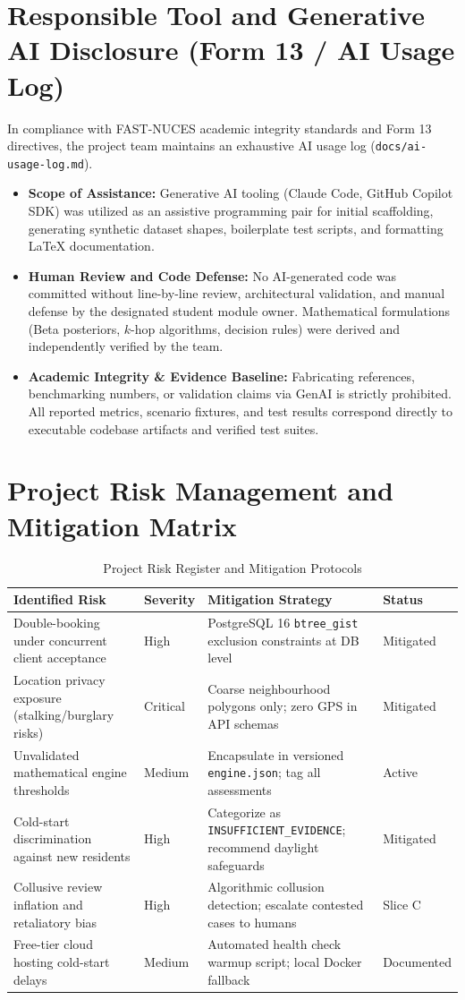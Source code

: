 \section{Responsible Tool and Generative AI Disclosure (Form 13 / AI Usage Log)}
In compliance with FAST-NUCES academic integrity standards and Form 13 directives, the project team maintains an exhaustive AI usage log (\texttt{docs/ai-usage-log.md}).
\begin{itemize}
    \item \textbf{Scope of Assistance:} Generative AI tooling (Claude Code, GitHub Copilot SDK) was utilized as an assistive programming pair for initial scaffolding, generating synthetic dataset shapes, boilerplate test scripts, and formatting LaTeX documentation.
    \item \textbf{Human Review and Code Defense:} No AI-generated code was committed without line-by-line review, architectural validation, and manual defense by the designated student module owner. Mathematical formulations (Beta posteriors, $k$-hop algorithms, decision rules) were derived and independently verified by the team.
    \item \textbf{Academic Integrity \& Evidence Baseline:} Fabricating references, benchmarking numbers, or validation claims via GenAI is strictly prohibited. All reported metrics, scenario fixtures, and test results correspond directly to executable codebase artifacts and verified test suites.
\end{itemize}

\section{Project Risk Management and Mitigation Matrix}
\begin{table}[htbp]
\centering
\caption{Project Risk Register and Mitigation Protocols}
\label{tab:risk_matrix}
\small
\begin{tabularx}{\textwidth}{p{4.5cm} l p{5.5cm} l}
\toprule
\textbf{Identified Risk} & \textbf{Severity} & \textbf{Mitigation Strategy} & \textbf{Status} \\
\midrule
Double-booking under concurrent client acceptance & High & PostgreSQL 16 \texttt{btree\_gist} exclusion constraints at DB level & Mitigated \\
Location privacy exposure (stalking/burglary risks) & Critical & Coarse neighbourhood polygons only; zero GPS in API schemas & Mitigated \\
Unvalidated mathematical engine thresholds & Medium & Encapsulate in versioned \texttt{engine.json}; tag all assessments & Active \\
Cold-start discrimination against new residents & High & Categorize as \texttt{INSUFFICIENT\_EVIDENCE}; recommend daylight safeguards & Mitigated \\
Collusive review inflation and retaliatory bias & High & Algorithmic collusion detection; escalate contested cases to humans & Slice C \\
Free-tier cloud hosting cold-start delays & Medium & Automated health check warmup script; local Docker fallback & Documented \\
\bottomrule
\end{tabularx}
\end{table}
